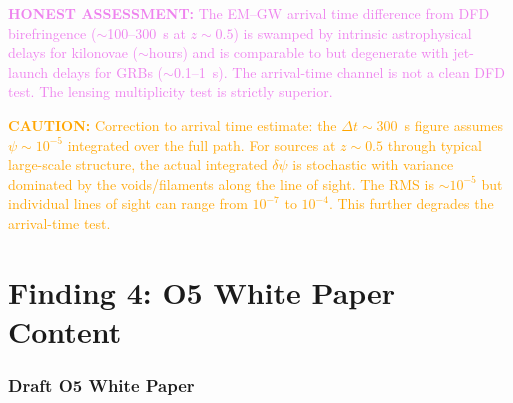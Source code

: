 \documentclass[11pt]{article}
\theoremstyle{definition}
\theoremstyle{remark}
\newcommand{\caution}[1]{\textcolor{orange}{\textbf{CAUTION:} #1}}
\newcommand{\honest}[1]{\textcolor{violet}{\textbf{HONEST ASSESSMENT:} #1}}
\begin{document}
\honest{The EM--GW arrival time difference from DFD birefringence
($\sim$100--300~s at $z \sim 0.5$) is swamped by intrinsic astrophysical
delays for kilonovae ($\sim$hours) and is comparable to but degenerate with
jet-launch delays for GRBs ($\sim$0.1--1~s). The arrival-time channel
is not a clean DFD test. The lensing multiplicity test is strictly superior.}

\caution{Correction to arrival time estimate: the $\Delta t \sim 300$~s
figure assumes $\psi \sim 10^{-5}$ integrated over the full path. For
sources at $z \sim 0.5$ through typical large-scale structure, the actual
integrated $\delta\psi$ is stochastic with variance dominated by the
voids/filaments along the line of sight. The RMS is $\sim$$10^{-5}$ but
individual lines of sight can range from $10^{-7}$ to $10^{-4}$. This
further degrades the arrival-time test.}


\part{Finding 4: O5 White Paper Content}
\label{part:O5-whitepaper}

\section{Draft O5 White Paper}
\end{document}
